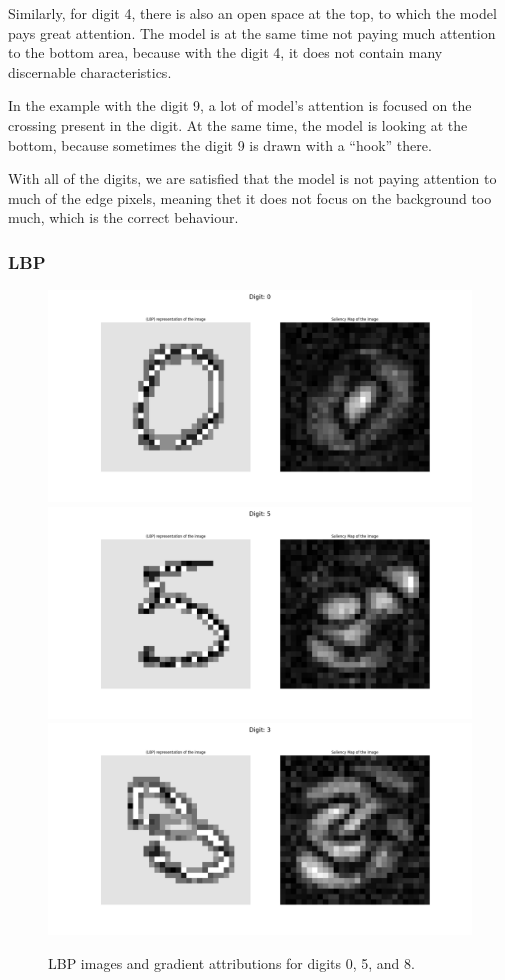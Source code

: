 \documentclass[journal, a4paper]{IEEEtran}
\begin{document}
Similarly, for digit 4, there is also an open space at the top, to which the model pays great attention. 
The model is at the same time not paying much attention to the bottom area, because with the digit 4, it does not contain many discernable characteristics.

In the example with the digit 9, a lot of model's attention is focused on the crossing present in the digit. At the same time, the model is looking at the bottom, because sometimes the digit 9 is drawn with a ``hook'' there.

With all of the digits, we are satisfied that the model is not paying attention to much of the edge pixels, meaning thet it does not focus on the background too much,
which is the correct behaviour. 

\subsubsection{LBP}

\begin{figure}[ht]\centering
    \includegraphics[width=.6\linewidth]{img/saliency_lbp/0}
    \includegraphics[width=.6\linewidth]{img/saliency_lbp/5}
    \includegraphics[width=.6\linewidth]{img/saliency_lbp/8}
    \caption{LBP images and gradient attributions for digits 0, 5, and 8.}\label{fig:lbp-attributions}
\end{figure}
\end{document}
